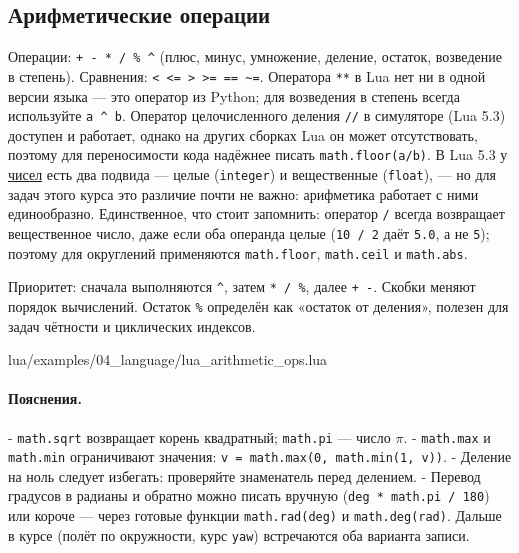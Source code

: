 \subsection{Арифметические операции}
Операции: \verb|+ - * / % ^| (плюс, минус, умножение, деление, остаток, возведение в степень). Сравнения: \verb|< <= > >= == ~=|. Оператора \verb|**| в Lua нет ни в одной версии языка — это оператор из Python; для возведения в степень всегда используйте \verb|a ^ b|. Оператор целочисленного деления \verb|//| в симуляторе (Lua 5.3) доступен и работает, однако на других сборках Lua он может отсутствовать, поэтому для переносимости кода надёжнее писать \verb|math.floor(a/b)|. В Lua 5.3 у \hyperlink{term:number}{чисел} есть два подвида — целые (\verb|integer|) и вещественные (\verb|float|), — но для задач этого курса это различие почти не важно: арифметика работает с ними единообразно. Единственное, что стоит запомнить: оператор \verb|/| всегда возвращает вещественное число, даже если оба операнда целые (\verb|10 / 2| даёт \verb|5.0|, а не \verb|5|); поэтому для округлений применяются \verb|math.floor|, \verb|math.ceil| и \verb|math.abs|.

Приоритет: сначала выполняются \verb|^|, затем \verb|* / %|, далее \verb|+ -|. Скобки меняют порядок вычислений. Остаток \verb|%| определён как «остаток от деления», полезен для задач чётности и циклических индексов.
\begin{codefile}{lua/examples/04_language/lua_arithmetic_ops.lua}
\end{codefile}
\paragraph{Пояснения.}
- \verb|math.sqrt| возвращает корень квадратный; \verb|math.pi| — число $\pi$.
- \verb|math.max| и \verb|math.min| ограничивают значения: \verb|v = math.max(0, math.min(1, v))|.
- Деление на ноль следует избегать: проверяйте знаменатель перед делением.
- Перевод градусов в радианы и обратно можно писать вручную (\verb|deg * math.pi / 180|) или короче — через готовые функции \verb|math.rad(deg)| и \verb|math.deg(rad)|. Дальше в курсе (полёт по окружности, курс \verb|yaw|) встречаются оба варианта записи.
